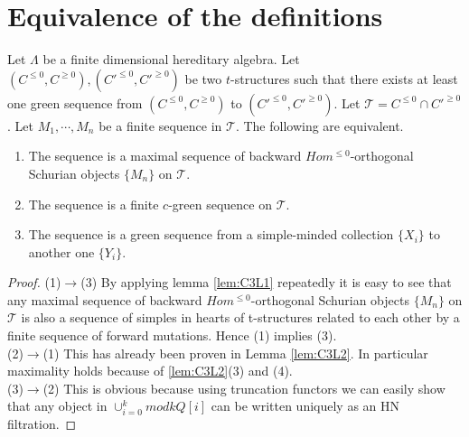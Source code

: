 \section{Equivalence of the definitions}
\begin{theorem}\label{C3TB}
\indent Let $\Lambda$ be a finite dimensional hereditary algebra. Let $(C^{\leq 0}, C^{\geq 0}), (C'^{\leq 0}, C'^{\geq 0})$ be two $t$-structures such that there exists at least one green sequence from $(C^{\leq 0}, C^{\geq 0})$ to $(C'^{\leq 0}, C'^{\geq 0})$. Let $\mathcal{T} = C^{\leq 0}\cap C'^{\geq 0}$.  Let $M_1,\cdots, M_n$ be a finite sequence in $\mathcal{T}$. The following are equivalent.
\begin{enumerate}
\item The sequence is a maximal sequence of backward $Hom^{\leq 0}$-orthogonal Schurian objects $\{M_n\}$ on $\mathcal{T}$.
\item The sequence is a finite $c$-green sequence on $\mathcal{T}$.
\item The sequence is a green sequence from a simple-minded collection $\{X_i\}$ to another one $\{Y_i\}$.
\end{enumerate}
\end{theorem}
\begin{proof}
(1)$\to$(3) By applying lemma \ref{lem:C3L1} repeatedly it is easy to see that any maximal sequence of backward $Hom^{\leq 0}$-orthogonal Schurian objects $\{M_n\}$ on $\mathcal{T}$ is also a sequence of simples in hearts of t-structures related to each other by a finite sequence of forward mutations. Hence (1) implies (3).\\
(2)$\to$(1) This has already been proven in Lemma \ref{lem:C3L2}. In particular maximality holds because of \ref{lem:C3L2}(3) and (4).\\
(3)$\to$(2) This is obvious because using truncation functors we can easily show that any object in $\cup_{i=0}^k mod kQ[i]$ can be written uniquely as an HN filtration. 
\end{proof}